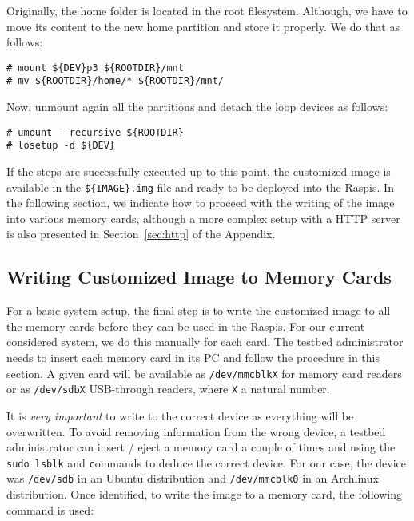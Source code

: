 Originally, the home folder is located in the root filesystem. Although,
we have to move its content to the new home partition and store it properly.
We do that as follows:

\begin{lstlisting}[]
# mount ${DEV}p3 ${ROOTDIR}/mnt
# mv ${ROOTDIR}/home/* ${ROOTDIR}/mnt/
\end{lstlisting}
\FloatBarrier
\vspace{-5mm}

Now, unmount again all the partitions and detach the loop devices as follows:
\begin{lstlisting}[]
# umount --recursive ${ROOTDIR}
# losetup -d ${DEV}
\end{lstlisting}
\FloatBarrier
\vspace{-5mm}

If the steps are successfully executed up to this point, the customized image
is available in the \texttt{\$\{IMAGE\}.img} file and ready to be deployed
into the \ac{Raspi}s. In the following section, we indicate how to proceed
with the writing of the image into various memory cards, although a more
complex setup with a \ac{HTTP} server is also presented in
Section~\ref{sec:http} of the Appendix.

\subsection{Writing Customized Image to Memory Cards}
For a basic system setup, the final step is to write the customized image
to all the memory cards before they can be used in the \ac{Raspi}s. For
our current considered system, we do this manually for each card.
The testbed administrator needs to insert each memory card in its \ac{PC}
and follow the procedure in this section. A given card will be available as
\texttt{/dev/mmcblkX} for memory card readers or as \texttt{/dev/sdbX}
USB-through readers, where \texttt{X} a natural number.

It is \textit{very
important} to write to the correct device as everything will be overwritten.
To avoid removing information from the wrong device, a testbed administrator
can insert / eject a memory card a couple of times and using the
\texttt{sudo lsblk} and \texttt commands to deduce the correct device.
For our case, the device was \texttt{/dev/sdb} in an Ubuntu distribution and
\texttt{/dev/mmcblk0} in an Archlinux distribution. Once identified, to write
the image to a memory card, the following command is used:

